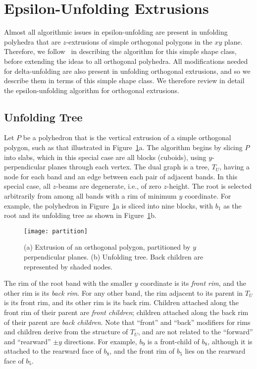 \documentclass[11pt]{article}
\begin{document}
\section{Epsilon-Unfolding Extrusions}
\label{Epsilon-Unfolding Extrusions}

Almost all algorithmic issues in epsilon-unfolding are present in unfolding polyhedra
that are $z$-extrusions of simple orthogonal polygons in the $xy$ plane.
Therefore, we follow~\cite{Damian-Flatland-O'Rourke-2007-epsilon} in describing
the algorithm for this simple shape class, before extending the ideas
to all orthogonal polyhedra.  All modifications needed for
delta-unfolding
are also present in unfolding orthogonal extrusions, and so we
describe them in terms of this simple shape class.
We therefore review in detail the epsilon-unfolding algorithm for orthogonal extrusions.

\subsection{Unfolding Tree}
\label{sec:Tree}
Let $P$ be a polyhedron that is the vertical extrusion of a simple orthogonal polygon, such
as that illustrated in Figure~\ref{fig:partition}a.
The algorithm
begins by slicing $P$ into slabs, which in this special case are all
blocks (cuboids),
using $y$-perpendicular planes through each vertex.
The dual graph is a tree, $T_U$, having a node for each band and an edge
between each pair of adjacent bands.
In this special case, all $z$-beams are degenerate, i.e., of zero $z$-height.
The root is selected arbitrarily from among
all bands with a rim of
minimum $y$ coordinate. For example, the
polyhedron in Figure~\ref{fig:partition}a is sliced into nine
blocks, with $b_1$ as the root and
its unfolding tree as shown in Figure~\ref{fig:partition}b.
\begin{figure}[htbp]
\centering
\texttt{[image: partition]}
\caption{(a) Extrusion of an orthogonal polygon, partitioned by $y$ perpendicular planes. (b) Unfolding
  tree. Back children are represented by shaded nodes.}
\label{fig:partition}
\end{figure}


The rim of the root band with the
smaller $y$ coordinate is its \emph{front rim}, and the other rim
is its \emph{back rim}. For any other band, the rim adjacent to its parent in $T_U$ is
its front rim, and its other rim is its back rim.
Children attached along the front rim of their parent are \emph{front children}; children attached
along the back rim of their parent are \emph{back children}.
Note that ``front'' and ``back'' modifiers for rims and children derive from the structure of
$T_U$, and are not related to the ``forward'' and ``rearward'' $\pm y$
directions.
For example, $b_9$ is a front-child of $b_8$, although it is attached
to
the rearward face of $b_8$, and the front rim of $b_5$ lies
on the rearward face of $b_5$.
\end{document}
